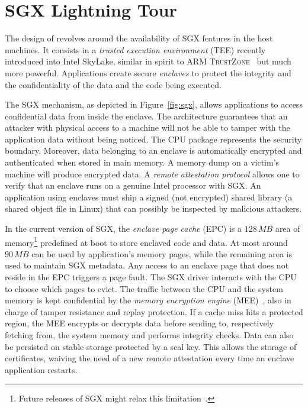 \section{SGX Lightning Tour}\label{sec:background}

The design of \SYS{} revolves around the availability of SGX features in the host machines.
It consists in a \emph{trusted execution environment} (TEE) recently introduced into Intel{\textregistered} SkyLake, similar in spirit to ARM \textsc{TrustZone}~\cite{arm2009security} but much more powerful.
Applications create secure \emph{enclaves} to protect the integrity and the confidentiality of the data and the code being executed.

The SGX mechanism, as depicted in Figure~\ref{fig:sgx}, allows applications to access confidential data from inside the enclave.
The architecture guarantees that an attacker with physical access to a machine will not be able to tamper with the application data without being noticed.
The CPU package represents the security boundary.
Moreover, data belonging to an enclave is automatically encrypted and authenticated when stored in main memory.
A memory dump on a victim’s machine will produce encrypted data.
A \emph{remote attestation protocol} allows one to verify that an enclave runs on a genuine Intel{\textregistered} processor with SGX.
An application using enclaves must ship a signed (not encrypted) shared library (a shared object file in Linux) that can possibly be inspected by malicious attackers.

In the current version of SGX, the \emph{enclave page cache} (EPC) is a $128\,\mathit{MB}$ area of memory\footnote{Future releases of SGX might relax this limitation~\cite{mckeen2016intel}.} predefined at boot to store enclaved code and data.
At most around $90\,\mathit{MB}$ can be used by application’s memory pages, while the remaining area is used to maintain SGX metadata.
Any access to an enclave page that does not reside in the EPC triggers a page fault.
The SGX driver interacts with the CPU to choose which pages to evict.
The traffic between the CPU and the system memory is kept confidential by the \emph{memory encryption engine} (MEE)~\cite{gueron2016memory}, also in charge of tamper resistance and replay protection.
If a cache miss hits a protected region, the MEE encrypts or decrypts data before sending to, respectively fetching from, the system memory and performs integrity checks.
Data can also be persisted on stable storage protected by a seal key.
This allows the storage of certificates, waiving the need of a new remote attestation every time an enclave application restarts.

